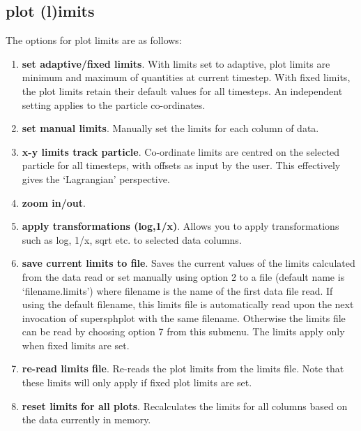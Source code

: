 \documentclass[a4paper,11pt]{article}
\begin{document}
\subsection{plot (l)imits}
\label{sec:optionslimits}
 The options for plot limits are as follows:
\begin{enumerate}
\item \textbf{set adaptive/fixed limits}. With limits set to adaptive, plot
limits are minimum and maximum of quantities at current
timestep. With fixed limits, the plot limits retain their default values
for all timesteps. An independent setting applies to the particle co-ordinates.
\item \textbf{set manual limits}. Manually set the limits for each column of
data.
\item \textbf{x-y limits track particle}. Co-ordinate limits are centred on the
selected particle for all timesteps, with offsets as input by the user. This
effectively gives the `Lagrangian' perspective.
\item \textbf{zoom in/out}.
\item \textbf{apply transformations (log,1/x)}. Allows you to apply transformations such as log, 1/x, sqrt
etc. to selected data columns.
\item \textbf{save current limits to file}. Saves the current values of the
limits calculated from the data read or set manually using option 2 to a
file (default name is `filename.limits') where filename is the name of the first data file
read. If using the default filename, this limits file is automatically read upon the next
invocation of supersphplot with the same filename.
Otherwise the limits file can be read by choosing option 7 from this submenu. The limits apply
only when fixed limits are set.
\item \textbf{re-read limits file}. Re-reads the plot limits from the
limits file. Note that these limits will only apply if fixed plot limits are set.
\item \textbf{reset limits for all plots}. Recalculates the limits for all columns based on
the data currently in memory.
\end{enumerate}
\end{document}
